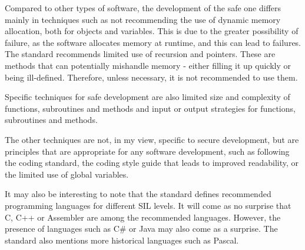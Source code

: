 Compared to other types of software, the development of the safe one differs mainly in techniques such as {\sbf not recommending the use of dynamic memory allocation}, both for objects and variables. This is due to the greater possibility of failure, as the software allocates memory at runtime, and this can lead to failures. The standard recommends {\sbf limited use of recursion and pointers}. These are methods that can potentially mishandle memory - either filling it up quickly or being ill-defined. Therefore, unless necessary, it is not recommended to use them.

Specific techniques for safe development are also {\sbf limited size and complexity of functions, subroutines and methods} and {\sbf input or output strategies for functions, subroutines and methods}.

The other techniques are not, in my view, specific to secure development, but are principles that are appropriate for any software development, such as following the {\sbf coding standard}, the {\sbf coding style guide} that leads to improved readability, or the {\sbf limited use of global variables}.

It may also be interesting to note that the standard defines {\sbf recommended programming languages} for different SIL levels. It will come as no surprise that C, C++ or Assembler are among the recommended languages. However, the presence of languages such as C\# or Java may also come as a surprise. The standard also mentions more historical languages such as Pascal.